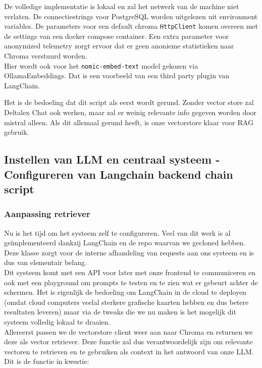 De volledige implementatie is lokaal en zal het netwerk van de machine niet verlaten.
De connectiestrings voor PostgreSQL worden uitgelezen uit environment variables.
De parameters voor een default chroma \lstinline{HttpClient} komen overeen met de settings van een docker compose container.
Een extra parameter voor anonymized telemetry zorgt ervoor dat er geen anonieme statistieken naar Chroma verstuurd worden. \\

Hier wordt ook voor het \lstinline{nomic-embed-text} model gekozen via OllamaEmbeddings.
Dat is een voorbeeld van een third party plugin van LangChain.

Het is de bedoeling dat dit script als eerst wordt gerund. Zonder vector store zal Deltalex Chat ook werken, maar zal er weinig relevante info gegeven worden door mistral alleen.
Als dit allemaal gerund heeft, is onze vectorstore klaar voor RAG gebruik.

\newpage
\subsection{Instellen van LLM en centraal systeem - Configureren van Langchain backend chain script}
\subsubsection{Aanpassing retriever}

Nu is het tijd om het systeem zelf te configureren. Veel van dit werk is al geïmplementeerd dankzij LangChain en de repo waarvan we gecloned hebben.
Deze klasse zorgt voor de interne afhandeling van requests aan ons systeem en is dus van elementair belang. \\ 

Dit systeem komt met een API voor later met onze frontend te communiceren en ook met een playground om prompts te testen en te zien wat er gebeurt achter de schermen. 
Het is eigenlijk de bedoeling om LangChain in de cloud te deployen (omdat cloud computers veelal sterkere grafische kaarten hebben en dus betere resultaten leveren)
maar via de tweaks die we nu maken is het mogelijk dit systeem volledig lokaal te draaien.\\

Allereerst passen we de vectorstore client weer aan naar Chroma en returnen we deze als vector retriever.
Deze functie zal dus verantwoordelijk zijn om relevante vectoren te retrieven en te gebruiken als context in het antwoord van onze LLM.
Dit is de functie in kwestie:

